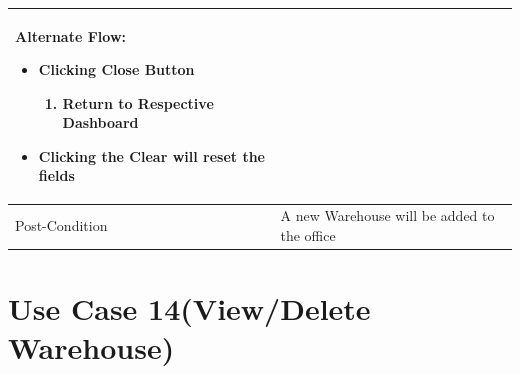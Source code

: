 \documentclass[12pt,a4paper]{report}
\begin{document}
\begin{tabular}{ | m{3cm} | m{12cm}| }
\begin{enumerate}
\end{enumerate}

Alternate Flow:

\begin{itemize}
\item 	Clicking Close Button
	\begin{enumerate}
		\item 	Return to Respective Dashboard
	\end{enumerate}
\item Clicking the Clear will reset the fields
\end{itemize}
\\ \hline
Post-Condition &  A new Warehouse will be added to the office   \\ \hline

\end{tabular}
\section{ Use Case 14(View/Delete Warehouse)}
\end{document}
